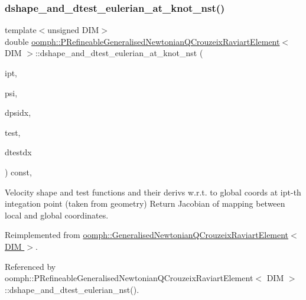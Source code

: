 \subsubsection{\texorpdfstring{dshape\+\_\+and\+\_\+dtest\+\_\+eulerian\+\_\+at\+\_\+knot\+\_\+nst()}{dshape\_and\_dtest\_eulerian\_at\_knot\_nst()}\hspace{0.1cm}{\footnotesize\ttfamily [1/3]}}
{\footnotesize\ttfamily template$<$unsigned D\+IM$>$ \\
double \hyperlink{classoomph_1_1PRefineableGeneralisedNewtonianQCrouzeixRaviartElement}{oomph\+::\+P\+Refineable\+Generalised\+Newtonian\+Q\+Crouzeix\+Raviart\+Element}$<$ D\+IM $>$\+::dshape\+\_\+and\+\_\+dtest\+\_\+eulerian\+\_\+at\+\_\+knot\+\_\+nst (\begin{DoxyParamCaption}\item[{const unsigned \&}]{ipt,  }\item[{\hyperlink{classoomph_1_1Shape}{Shape} \&}]{psi,  }\item[{\hyperlink{classoomph_1_1DShape}{D\+Shape} \&}]{dpsidx,  }\item[{\hyperlink{classoomph_1_1Shape}{Shape} \&}]{test,  }\item[{\hyperlink{classoomph_1_1DShape}{D\+Shape} \&}]{dtestdx }\end{DoxyParamCaption}) const\hspace{0.3cm}{\ttfamily [inline]}, {\ttfamily [virtual]}}



Velocity shape and test functions and their derivs w.\+r.\+t. to global coords at ipt-\/th integation point (taken from geometry) Return Jacobian of mapping between local and global coordinates. 



Reimplemented from \hyperlink{classoomph_1_1GeneralisedNewtonianQCrouzeixRaviartElement_a8320a0d6ad5e4f9a19ab412fb69c00e7}{oomph\+::\+Generalised\+Newtonian\+Q\+Crouzeix\+Raviart\+Element$<$ D\+I\+M $>$}.



Referenced by oomph\+::\+P\+Refineable\+Generalised\+Newtonian\+Q\+Crouzeix\+Raviart\+Element$<$ D\+I\+M $>$\+::dshape\+\_\+and\+\_\+dtest\+\_\+eulerian\+\_\+nst().

\mbox{\label{classoomph_1_1PRefineableGeneralisedNewtonianQCrouzeixRaviartElement_a7b223143f207155ce82ddaec2d2d7e1e}} 
